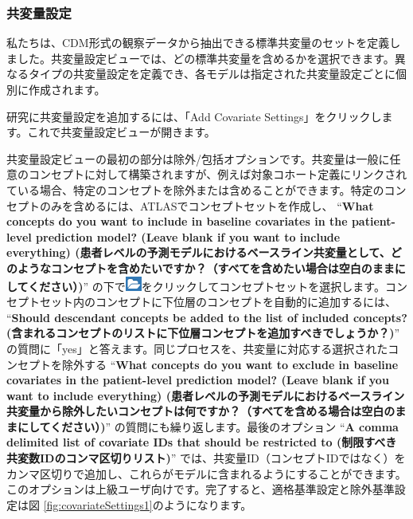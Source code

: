 \documentclass[
  11pt]{book}
\theoremstyle{definition}
\theoremstyle{definition}
\theoremstyle{definition}
\theoremstyle{definition}
\theoremstyle{remark}
\begin{document}
\subsubsection*{共変量設定}\label{ux5171ux5909ux91cfux8a2dux5b9a}

私たちは、CDM形式の観察データから抽出できる標準共変量のセットを定義しました。共変量設定ビューでは、どの標準共変量を含めるかを選択できます。異なるタイプの共変量設定を定義でき、各モデルは指定された共変量設定ごとに個別に作成されます。

研究に共変量設定を追加するには、「Add Covariate Settings」をクリックします。これで共変量設定ビューが開きます。

共変量設定ビューの最初の部分は除外/包括オプションです。共変量は一般に任意のコンセプトに対して構築されますが、例えば対象コホート定義にリンクされている場合、特定のコンセプトを除外または含めることができます。特定のコンセプトのみを含めるには、ATLASでコンセプトセットを作成し、 ``\textbf{What concepts do you want to include in baseline covariates in the patient-level prediction model? (Leave blank if you want to include everything) (患者レベルの予測モデルにおけるベースライン共変量として、どのようなコンセプトを含めたいですか？（すべてを含めたい場合は空白のままにしてください）)}'' の下で\includegraphics{images/PopulationLevelEstimation/open.png}をクリックしてコンセプトセットを選択します。コンセプトセット内のコンセプトに下位層のコンセプトを自動的に追加するには、 ``\textbf{Should descendant concepts be added to the list of included concepts? (含まれるコンセプトのリストに下位層コンセプトを追加すべきでしょうか？)}'' の質問に「yes」と答えます。同じプロセスを、共変量に対応する選択されたコンセプトを除外する ``\textbf{What concepts do you want to exclude in baseline covariates in the patient-level prediction model? (Leave blank if you want to include everything) (患者レベルの予測モデルにおけるベースライン共変量から除外したいコンセプトは何ですか？（すべてを含める場合は空白のままにしてください）)}'' の質問にも繰り返します。最後のオプション ``\textbf{A comma delimited list of covariate IDs that should be restricted to (制限すべき共変数IDのコンマ区切りリスト)}'' では、共変量ID（コンセプトIDではなく）をカンマ区切りで追加し、これらがモデルに含まれるようにすることができます。このオプションは上級ユーザ向けです。完了すると、適格基準設定と除外基準設定は図 \ref{fig:covariateSettings1}のようになります。
\end{document}

